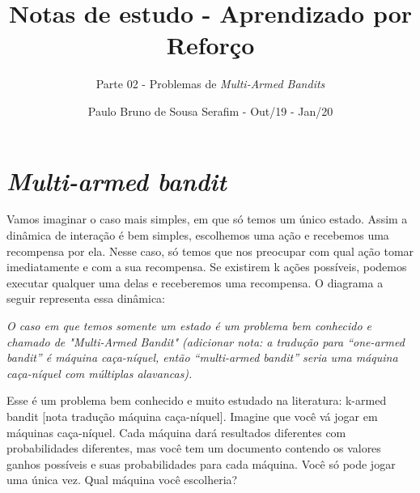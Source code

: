 \documentclass{article}
\title{Notas de estudo - Aprendizado por Reforço}
\author{Parte 02 - Problemas de \emph{Multi-Armed Bandits}}
\date{Paulo Bruno de Sousa Serafim - Out/19 - Jan/20}
\begin{document}
\maketitle

    \section{\textit{Multi-armed bandit}}
    
        Vamos imaginar o caso mais simples, em que só temos um único estado. Assim a dinâmica de interação é bem simples, escolhemos uma ação e recebemos uma recompensa por ela. Nesse caso, só temos que nos preocupar com qual ação tomar imediatamente e com a sua recompensa. Se existirem k ações possíveis, podemos executar qualquer uma delas e receberemos uma recompensa. O diagrama a seguir representa essa dinâmica:
    
        \begin{center}
            \simplebandit
        \end{center}
    
        \textit{O caso em que temos somente um estado é um problema bem conhecido e chamado de "Multi-Armed Bandit" (adicionar nota: a tradução para ``one-armed bandit'' é máquina caça-níquel, então ``multi-armed bandit'' seria uma máquina caça-níquel com múltiplas alavancas).}
        
        Esse é um problema bem conhecido e muito estudado na literatura: k-armed bandit [nota tradução máquina caça-níquel]. Imagine que você vá jogar em máquinas caça-níquel. Cada máquina dará resultados diferentes com probabilidades diferentes, mas você tem um documento contendo os valores ganhos possíveis e suas probabilidades para cada máquina. Você só pode jogar uma única vez. Qual máquina você escolheria?
    
        \begin{center}
        \end{center}
    
\end{document}
